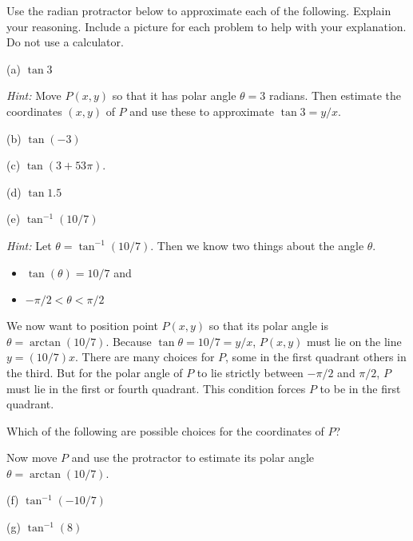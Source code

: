 \documentclass{ximera}
\begin{document}
\begin{question} \label{Q10:InverseTrig}
Use the radian protractor below to approximate each of the following. Explain your reasoning. Include a picture for each problem to help with your explanation. Do not use a calculator.

(a) $\tan 3$

\emph{Hint: } Move $P(x,y)$ so that it has polar angle $\theta =3$ radians. Then estimate the coordinates $(x,y)$ of $P$ and use these to approximate $\tan 3 = y/x$.

(b) $\tan (-3)$

(c) $\tan (3+53\pi)$.

(d) $\tan 1.5$

(e) $\tan^{-1}(10/7)$

\emph{Hint: } Let $\theta = \tan^{-1}(10/7)$. Then we know two things about the angle $\theta$.
\begin{itemize}
\item{$\tan (\theta) = 10/7$ and}

\item{$-\pi/2 < \theta <\pi/2$}

\end{itemize}

We now want to position point $P(x,y)$ so that its polar angle is $\theta = \arctan(10/7)$. Because $\tan\theta = 10/7 = y/x$, $P(x,y)$ must lie on the line $y=(10/7)x$. There are many choices for $P$, some in the first quadrant others in the third. But for 
the polar angle of $P$ to lie strictly between $-\pi/2$ and $\pi/2$, $P$ must lie in the first or fourth quadrant. This condition forces $P$ to be in the first quadrant.


\begin{question}  \label{Q35445fg}
Which of the following are possible choices for the coordinates of $P$?
\begin{multipleChoice}  
\end{multipleChoice}   
\end{question}

Now move $P$ and use the protractor to estimate its polar angle  $\theta = \arctan(10/7)$. 



(f) $\tan^{-1}(-10/7)$

(g) $\tan^{-1}(8)$


\end{question}
\end{document}
